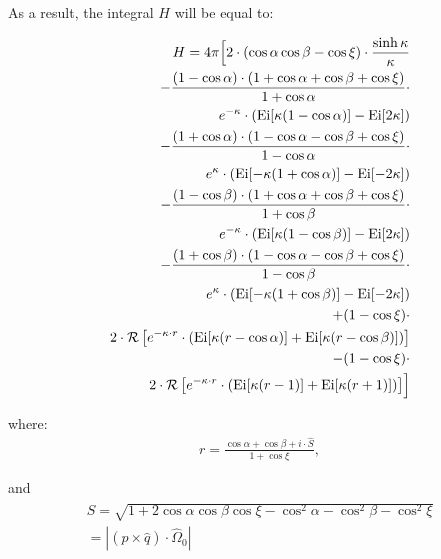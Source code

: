 As a result, the integral $H$ will be equal to:

\begin{equation}\begin{aligned}
H = 4 \pi \Bigl[2\cdot(\cos \alpha \cos \beta - \cos \xi) \cdot \frac{\sinh \kappa}{\kappa} \\ - \frac{(1-\cos \alpha) \cdot (1 + \cos \alpha + \cos \beta + \cos \xi)}{1 + \cos \alpha} \cdot \\  e^{-\kappa} \cdot \left(\text{Ei} [\kappa(1 - \cos \alpha)] - \text{Ei}[2\kappa] \right) \\ - \frac{(1+\cos \alpha) \cdot (1 - \cos \alpha - \cos \beta + \cos \xi)}{1 - \cos \alpha} \cdot \\ e^{\kappa} \cdot \left(\text{Ei} [- \kappa(1 + \cos \alpha)] - \text{Ei}[-2\kappa] \right) \\ - \frac{(1-\cos \beta) \cdot (1 + \cos \alpha + \cos \beta + \cos \xi)}{1 + \cos \beta} \cdot \\ e^{-\kappa} \cdot \left(\text{Ei} [\kappa(1 - \cos \beta)] - \text{Ei}[2\kappa] \right) \\ - \frac{(1+\cos \beta) \cdot (1 - \cos \alpha - \cos \beta + \cos \xi)}{1 - \cos \beta} \cdot \\ e^{\kappa} \cdot \left(\text{Ei} [- \kappa(1 + \cos \beta)] - \text{Ei}[-2\kappa] \right) \\ + (1 - \cos \xi) \cdot \\  2 \cdot \mathcal{R} \left[ e^{-\kappa \cdot r} \cdot \left(\text{Ei} [\kappa(r - \cos \alpha)] + \text{Ei}[\kappa(r - \cos \beta)] \right) \right] \\ - (1 - \cos \xi) \cdot \\ 2 \cdot \mathcal{R} \left[ e^{-\kappa \cdot r} \cdot \left(\text{Ei} [\kappa(r - 1)] + \text{Ei}[\kappa(r + 1)] \right) \right]
\Bigr]
\end{aligned}\end{equation}

where:
\begin{equation}\begin{aligned}
r = \frac{\cos \alpha + \cos \beta + i \cdot \hat{S}}{1 + \cos \xi}, 
\end{aligned}\end{equation}

and 
\begin{equation}\begin{aligned}
\hat{S} = \sqrt{1 + 2 \cos \alpha \cos \beta \cos \xi - \cos^2 \alpha - \cos^2 \beta - \cos^2 \xi} \\ = |(\hat{p}\times \hat{q})\cdot \hat{\Omega}_0|
\end{aligned}\end{equation}

